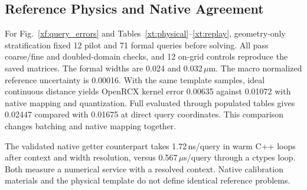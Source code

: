 \subsection{Reference Physics and Native Agreement}
For Fig.~\ref{xf:query_errors} and Tables~\ref{xt:physical}--\ref{xt:replay}, geometry-only stratification fixed 12 pilot and 71 formal queries before solving. All pass coarse/fine and doubled-domain checks, and 12 on-grid controls reproduce the saved matrices. The formal widths are 0.024 and 0.032\,$\mu$m. The macro normalized reference uncertainty is 0.00016. With the same template samples, ideal continuous distance yields OpenRCX kernel error 0.00635 against 0.01072 with native mapping and quantization. Full evaluated through populated tables gives 0.02447 compared with 0.01675 at direct query coordinates. This comparison changes batching and native mapping together.

The validated native getter counterpart takes 1.72\,ns/query in warm C++ loops after context and width resolution, versus 0.567\,$\mu$s/query through a ctypes loop. Both measure a numerical service with a resolved context. Native calibration materials and the physical template do not define identical reference problems.
\clearpage
